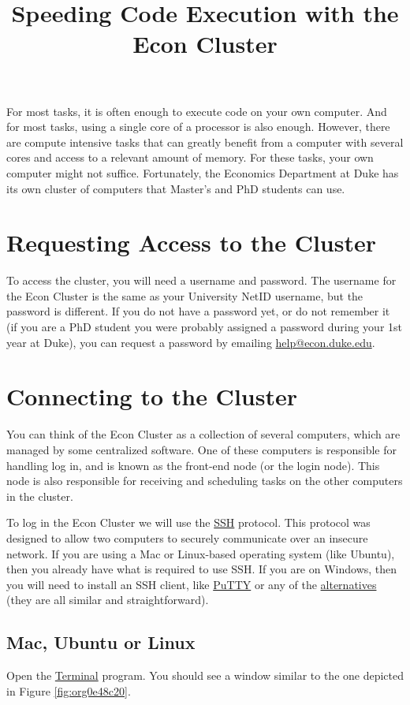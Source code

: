 \documentclass[12pt, a4paper]{article}
\date{}
\title{Speeding Code Execution with the Econ Cluster}
\begin{document}
\maketitle
For most tasks, it is often enough to execute code on your own computer.
And for most tasks, using a single core of a processor is also enough.
However, there are compute intensive tasks that can greatly benefit from a computer with several cores and access to a relevant amount of memory.
For these tasks, your own computer might not suffice.
Fortunately, the Economics Department at Duke has its own cluster of computers that Master's and PhD students can use.
\section{Requesting Access to the Cluster}
\label{sec:org5ee5c2a}
To access the cluster, you will need a username and password.
The username for the Econ Cluster is the same as your University NetID username, but the password is different.
If you do not have a password yet, or do not remember it (if you are a PhD student you were probably assigned a password during your 1st year at Duke), you can request a password by emailing \href{mailto:help@econ.duke.edu}{help@econ.duke.edu}.
\section{Connecting to the Cluster}
\label{sec:org489e288}
You can think of the Econ Cluster as a collection of several computers, which are managed by some centralized software.
One of these computers is responsible for handling log in, and is known as the front-end node (or the login node).
This node is also responsible for receiving and scheduling tasks on the other computers in the cluster.

To log in the Econ Cluster we will use the \href{https://en.wikipedia.org/wiki/Secure\_Shell}{SSH} protocol.
This protocol was designed to allow two computers to securely communicate over an insecure network.
If you are using a Mac or Linux-based operating system (like Ubuntu), then you already have what is required to use SSH.
If you are on Windows, then you will need to install an SSH client, like \href{https://www.chiark.greenend.org.uk/\~sgtatham/putty/}{PuTTY} or any of the \href{https://www.puttygen.com/best-putty-alternatives-ssh-clients}{alternatives} (they are all similar and straightforward).
\subsection{Mac, Ubuntu or Linux}
\label{sec:org07888b6}
Open the \href{https://support.apple.com/guide/terminal/welcome/mac}{Terminal} program. You should see a window similar to the one depicted in Figure \ref{fig:org0e48c20}.
\end{document}
